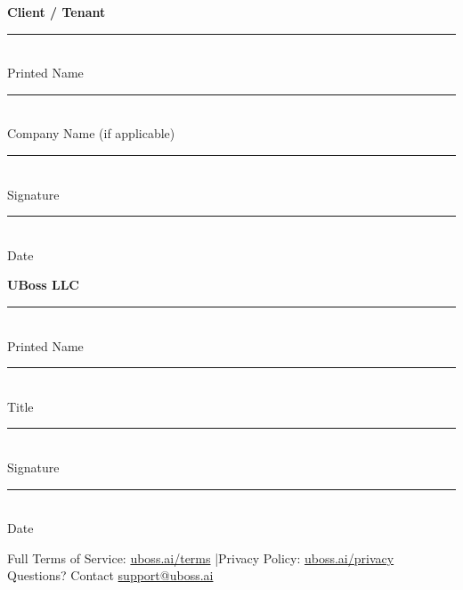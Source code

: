 \documentclass[11pt,letterpaper]{scrartcl}
\begin{document}
\begin{minipage}[t]{0.48\textwidth}
    {\bfseries\color{charcoal}Client / Tenant}\\[1.5em]
    \textcolor{ruleline}{\rule{\textwidth}{0.4pt}}\\[-0.3em]
    {\small Printed Name}\\[1.5em]
    \textcolor{ruleline}{\rule{\textwidth}{0.4pt}}\\[-0.3em]
    {\small Company Name (if applicable)}\\[1.5em]
    \textcolor{ruleline}{\rule{\textwidth}{0.4pt}}\\[-0.3em]
    {\small Signature}\\[1.5em]
    \textcolor{ruleline}{\rule{\textwidth}{0.4pt}}\\[-0.3em]
    {\small Date}
\end{minipage}
\hfill
\begin{minipage}[t]{0.48\textwidth}
    {\bfseries\color{charcoal}UBoss LLC}\\[1.5em]
    \textcolor{ruleline}{\rule{\textwidth}{0.4pt}}\\[-0.3em]
    {\small Printed Name}\\[1.5em]
    \textcolor{ruleline}{\rule{\textwidth}{0.4pt}}\\[-0.3em]
    {\small Title}\\[1.5em]
    \textcolor{ruleline}{\rule{\textwidth}{0.4pt}}\\[-0.3em]
    {\small Signature}\\[1.5em]
    \textcolor{ruleline}{\rule{\textwidth}{0.4pt}}\\[-0.3em]
    {\small Date}
\end{minipage}

\vspace{2em}

\begin{center}
    {\small\color{accent} Full Terms of Service: \href{https://uboss.ai/terms}{uboss.ai/terms} \quad|\quad Privacy Policy: \href{https://uboss.ai/privacy}{uboss.ai/privacy}}\\[0.5em]
    {\small\color{accent} Questions? Contact \href{mailto:support@uboss.ai}{support@uboss.ai}}
\end{center}
\end{document}
